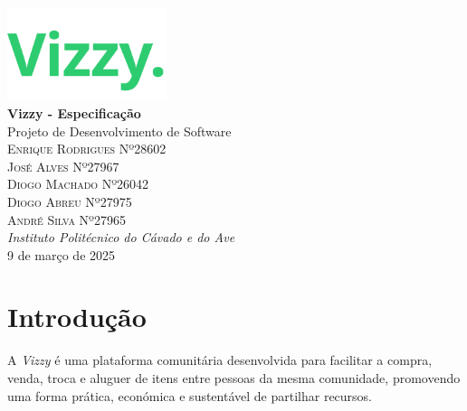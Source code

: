 \documentclass[a4paper, 12pt]{article} %
\renewcommand{\maketitle}{
\begin{titlepage}
\begin{center}
\vspace*{1cm}
\includegraphics[width=0.35\textwidth]{../images/logo-no-bg.png}\\[1cm] %
{\Huge\textbf{Vizzy - Especificação}}\\[0.5cm] %
{\Large Projeto de Desenvolvimento de Software}\\[2cm] %
{\large \textsc{
	Enrique Rodrigues Nº28602 \\
	José Alves Nº27967 \\
	Diogo Machado Nº26042 \\
	Diogo Abreu Nº27975 \\
	André Silva Nº27965}}\\[0.5cm] %
{\textit{Instituto Politécnico do Cávado e do Ave}}\\[1.5cm] %
{\large 9 de março de 2025} %
\vfill
\end{center}
\end{titlepage}
}
\begin{document}
\maketitle %







\newpage
\renewcommand{\contentsname}{Índice}
\tableofcontents


\newpage
\renewcommand{\listfigurename}{Lista de Figuras}
\listoffigures


\newpage
\section{Introdução}

A \textit{Vizzy} é uma plataforma comunitária desenvolvida para facilitar a compra, venda, troca e aluguer de itens entre pessoas da mesma comunidade, promovendo uma forma prática, económica e sustentável de partilhar recursos.
\end{document}
